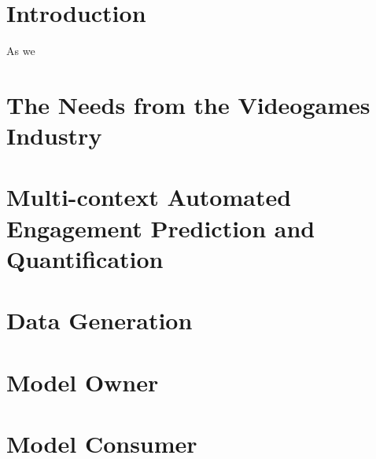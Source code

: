 \section{Introduction}
\label{industry_needs}
As we 

\section{The Needs from the Videogames Industry}
\label{industry_needs}
\lorem

\section{Multi-context Automated Engagement Prediction and Quantification}
\label{industry_needs}

\section{Data Generation}

\section{Model Owner}

\section{Model Consumer}



